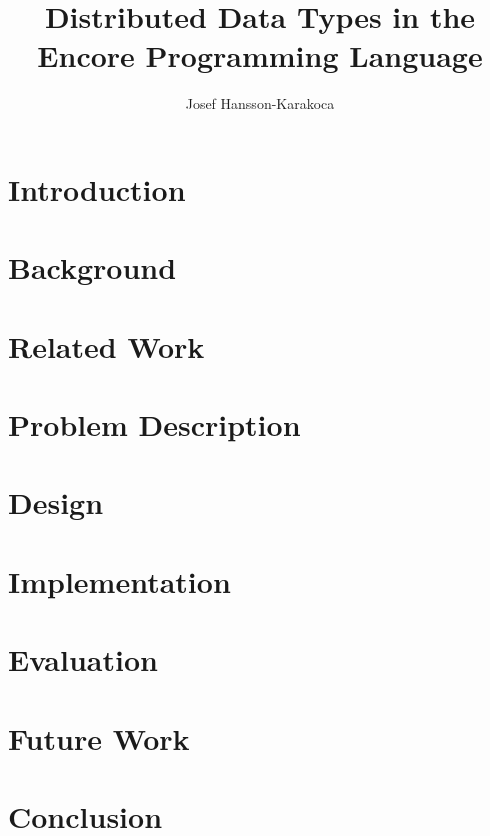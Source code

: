 \documentclass[12]{report}
\title{
    {Distributed Data Types in the Encore Programming Language}\\
    }
\author{Josef Hansson-Karakoca }
\begin{document}
\maketitle



\tableofcontents

\chapter{Introduction}


\chapter{Background}


\chapter{Related Work}


\chapter{Problem Description}


\chapter{Design}


\chapter{Implementation}


\chapter{Evaluation}


\chapter{Future Work}


\chapter{Conclusion}




\end{document}
